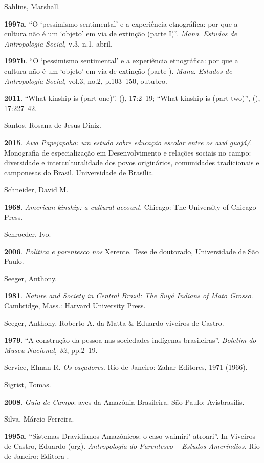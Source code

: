 Sahlins, Marshall.

\textbf{1997a}. ``O `pessimismo sentimental' e a experiência
etnográfica: por que a cultura não é um `objeto' em via de extinção
(parte I)''. \emph{Mana}. \emph{Estudos de Antropologia Social,} v.3,
n.1, abril.

\textbf{1997b}. ``O `pessimismo sentimental' e a experiência
etnográfica: por que a cultura não é um `objeto' em via de extinção
(parte ). \emph{Mana}. \emph{Estudos de Antropologia Social,} vol.3,
no.2, p.103--150, outubro.

\textbf{2011}. ``What kinship is (part one)''.  (), 17:2--19;
``What kinship is (part two)'',  (), 17:227--42.

Santos, Rosana de Jesus Diniz.

\textbf{2015}. \emph{Awa Papejapoha: um estudo sobre educação escolar
entre os awá guajá/}. Monografia de especialização em Desenvolvimento
e relações sociais no campo: diversidade e interculturalidade dos povos
originários, comunidades tradicionais e camponesas do Brasil,
Universidade de Brasília.

Schneider, David M.

\textbf{1968}. \emph{American kinship: a cultural account}. Chicago: The
University of Chicago Press.

Schroeder, Ivo.

\textbf{2006}. \emph{Política e parentesco nos} Xerente. Tese de
doutorado, Universidade de São Paulo.

Seeger, Anthony.

\textbf{1981}. \emph{Nature and Society in Central Brazil: The Suyá
Indians of Mato Grosso}. Cambridge, Mass.: Harvard University Press.

Seeger, Anthony, Roberto A. da Matta \& Eduardo viveiros de Castro.

\textbf{1979}. ``A construção da pessoa nas sociedades indígenas
brasileiras''. \emph{Boletim do Museu Nacional, 32}, pp.2--19.

Service, Elman R. \emph{Os caçadores}. Rio de Janeiro: Zahar Editores,
1971 (1966).

Sigrist, Tomas.

\textbf{2008}. \emph{Guia de Campo}: aves da Amazônia Brasileira. São
Paulo: Avisbrasilis.

Silva, Márcio Ferreira.

\textbf{1995a}. ``Sistemas Dravidianos Amazônicos: o caso
waimiri"-atroari''. In Viveiros de Castro, Eduardo (org).
\emph{Antropologia do Parentesco -- Estudos Ameríndios.} Rio de Janeiro:
Editora .


